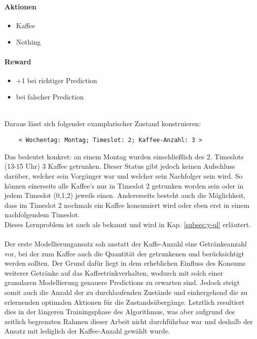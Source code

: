 \paragraph{Aktionen}
\begin{itemize}
	\item Kaffee
	\item Nothing
\end{itemize}

\paragraph{Reward}
\begin{itemize}
	\item +1 bei richtiger Prediction
	\item {} bei falscher Prediction
\end{itemize}
\ \\
Daraus lässt sich folgender examplarischer Zustand konstruieren: 
\begingroup
\makeatletter
\@totalleftmargin=0.5cm
\begin{Verbatim}
	< Wochentag: Montag; Timeslot: 2; Kaffee-Anzahl: 3 >
\end{Verbatim}
\endgroup
Das bedeutet konkret: an einem Montag wurden einschließlich des 2. Timeslots (13-15 Uhr) 3 Kaffee getrunken. Dieser Status gibt jedoch keinen Aufschluss darüber, welcher sein Vorgänger war und welcher sein Nachfolger sein wird. So können einerseits alle Kaffee's nur in Timeslot 2 getrunken worden sein oder in jedem Timeslot (0,1,2) jeweils einen. Andererseits besteht auch die Möglichkeit, dass im Timeslot 2 nochmals ein Kaffee konsumiert wird oder eben erst in einem nachfolgendem Timeslot.\\
Dieses Lernproblem ist auch als  bekannt und wird in Kap. \ref{subsec:y-ql} erläutert.
\\\\
Der erste Modellierungansatz sah anstatt der Kaffe-Anzahl eine Getränkeanzahl vor, bei der zum Kaffee auch die Quantität der getrunkenen  und  berücksichtigt werden sollten. Der Grund dafür liegt in dem erheblichen Einfluss des Konsums weiterer Getränke auf das Kaffeetrinkverhalten, wodurch mit solch einer granularen Modellierung genauere Predictions zu erwarten sind. Jedoch steigt somit auch die Anzahl der zu durchlaufenden Zustände und einhergehend die zu erlernenden optimalen Aktionen für die Zustandsübergänge. Letztlich resultiert dies in der längeren Trainingsphase des Algorithmus, was aber aufgrund des zeitlich begrenzten Rahmen dieser Arbeit nicht durchführbar war und deshalb der Ansatz mit lediglich der Kaffee-Anzahl gewählt wurde.\\

